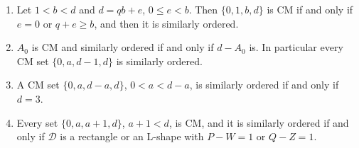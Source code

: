 \begin{proposition}[Families]\label{prop:families}
\begin{enumerate}
\item[(a)] Let $1<b<d$ and $d=qb+e$, $0\le e<b$. Then $\{0,1,b,d\}$ is CM if and only if $e=0$ or $q+e\ge b$, and then it is similarly ordered.
\item[(b)] $A_0$ is CM and similarly ordered if and only if $d-A_0$ is. In particular every CM set $\{0,a,d-1,d\}$ is similarly ordered.
\item[(c)] A CM set $\{0,a,d-a,d\}$, $0<a<d-a$, is similarly ordered if and only if $d=3$.
\item[(d)] Every set $\{0,a,a+1,d\}$, $a+1<d$, is CM, and it is similarly ordered if and only if $\mathcal D$ is a rectangle or an L-shape with $P-W=1$ or $Q-Z=1$.
\end{enumerate}
\end{proposition}

